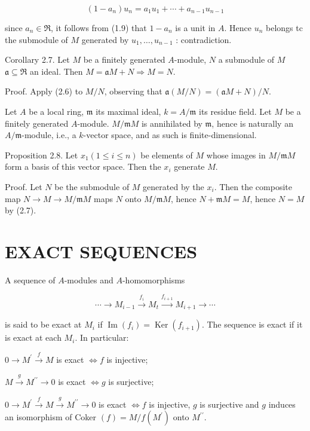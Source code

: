 \documentclass{standalone}
\theoremstyle{definition}
\theoremstyle{remark}
\begin{document}
\[
\left(1-a_{n}\right) u_{n}=a_{1} u_{1}+\cdots+a_{n-1} u_{n-1}
\]

since $a_{n} \in \Re$, it follows from (1.9) that $1-a_{n}$ is a unit in $A$. Hence $u_{n}$ belongs tc the submodule of $M$ generated by $u_{1}, \ldots, u_{n-1}$ : contradiction.

Corollary 2.7. Let $M$ be a finitely generated $A$-module, $N$ a submodule of $M$ $\mathfrak{a} \subseteq \mathfrak{R}$ an ideal. Then $M=\mathfrak{a} M+N \Rightarrow M=N$.

Proof. Apply (2.6) to $M / N$, observing that $\mathfrak{a}(M / N)=(\mathfrak{a} M+N) / N$.

Let $A$ be a local ring, $\mathfrak{m}$ its maximal ideal, $k=A / \mathfrak{m}$ its residue field. Let $M$ be a finitely generated $A$-module. $M / \mathfrak{m} M$ is annihilated by $\mathfrak{m}$, hence is naturally an $A / \mathfrak{m}$-module, i.e., a $k$-vector space, and as such is finite-dimensional.

Proposition 2.8. Let $x_{1}(1 \leqslant i \leqslant n)$ be elements of $M$ whose images in $M / \mathfrak{m} M$ form a basis of this vector space. Then the $x_{i}$ generate $M$.

Proof. Let $N$ be the submodule of $M$ generated by the $x_{i}$. Then the composite map $N \rightarrow M \rightarrow M / \mathfrak{m} M$ maps $N$ onto $M / \mathfrak{m} M$, hence $N+\mathfrak{m} M=M$, hence $N=M$ by (2.7).

\section{EXACT SEQUENCES}
A sequence of $A$-modules and $A$-homomorphisms

\[
\cdots \longrightarrow M_{i-1} \stackrel{f_{i}}{\longrightarrow} M_{t} \stackrel{f_{i+1}}{\longrightarrow} M_{i+1} \longrightarrow \cdots
\]

is said to be exact at $M_{i}$ if $\operatorname{Im}\left(f_{i}\right)=\operatorname{Ker}\left(f_{i+1}\right)$. The sequence is exact if it is exact at each $M_{i}$. In particular:

$0 \rightarrow M^{\prime} \stackrel{f}{\rightarrow} M$ is exact $\Leftrightarrow f$ is injective;

$M \stackrel{g}{\rightarrow} M^{\prime \prime} \rightarrow 0$ is exact $\Leftrightarrow g$ is surjective;

$0 \rightarrow M^{\prime} \stackrel{f}{\rightarrow} M \stackrel{g}{\rightarrow} M^{\prime \prime} \rightarrow 0$ is exact $\Leftrightarrow f$ is injective, $g$ is surjective and $g$ induces an isomorphism of Coker $(f)=M / f\left(M^{\prime}\right)$ onto $M^{\prime \prime}$.
\end{document}
